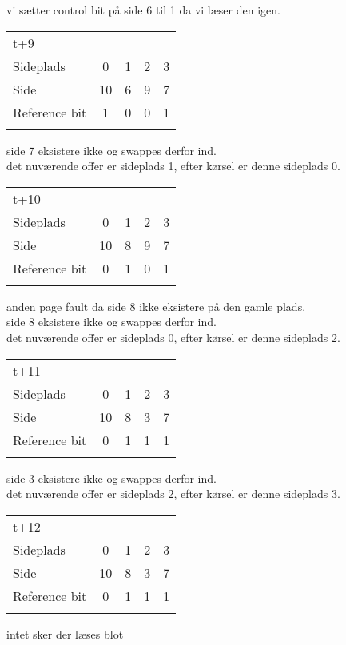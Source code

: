 \documentclass[titlepage]{article}
\begin{document}
vi sætter control bit på side 6 til 1 da vi læser den igen.\\


\begin{tabular}{l | c | c | c | c}
t+9\\
Sideplads    & 0 & 1 & 2 & 3\\
Side         & 10 & 6 & 9 & 7\\
Reference bit & 1 & 0 & 0 & 1\\\\
\end{tabular}

side 7 eksistere ikke og swappes derfor ind.\\
det nuværende offer er sideplads 1, efter kørsel er denne sideplads 0.\\

\begin{tabular}{l | c | c | c | c}
t+10\\
Sideplads    & 0 & 1 & 2 & 3\\
Side         & 10 & 8 & 9 & 7\\
Reference bit & 0 & 1 & 0 & 1\\\\
\end{tabular}

anden page fault da side 8 ikke eksistere på den gamle plads.\\
side 8 eksistere ikke og swappes derfor ind.\\
det nuværende offer er sideplads 0, efter kørsel er denne sideplads 2.\\

\begin{tabular}{l | c | c | c | c}
t+11\\
Sideplads    & 0 & 1 & 2 & 3\\
Side         & 10 & 8 & 3 & 7\\
Reference bit & 0 & 1 & 1 & 1\\\\
\end{tabular}

side 3 eksistere ikke og swappes derfor ind.\\
det nuværende offer er sideplads 2, efter kørsel er denne sideplads 3.\\


\begin{tabular}{l | c | c | c | c}
t+12\\
Sideplads    & 0 & 1 & 2 & 3\\
Side         & 10 & 8 & 3 & 7\\
Reference bit & 0 & 1 & 1 & 1\\\\
\end{tabular}

intet sker der læses blot\\
\end{document}
